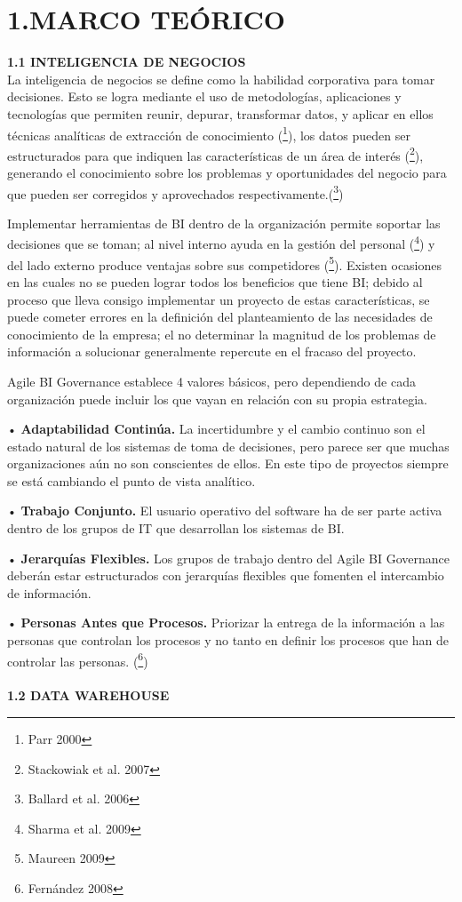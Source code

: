 \documentclass[a4paper,12pt,twocolumn]{article}
\begin{document}
\section*{1.MARCO TEÓRICO} 

\textbf {1.1 INTELIGENCIA DE NEGOCIOS}\\
La inteligencia de negocios se define como la habilidad corporativa para tomar decisiones. Esto se logra mediante el uso de metodologías, aplicaciones y tecnologías que permiten reunir, depurar, transformar datos, y aplicar en ellos técnicas analíticas de extracción de conocimiento (\footnote{Parr 2000}), los datos pueden ser estructurados para que indiquen las características de un área de interés (\footnote{Stackowiak et al. 2007}), generando el conocimiento sobre los problemas y oportunidades del negocio para que pueden ser corregidos y aprovechados respectivamente.(\footnote{Ballard et al. 2006})

Implementar herramientas de BI dentro de la organización permite soportar las decisiones que se toman; al nivel interno ayuda en la gestión del personal (\footnote{Sharma et al. 2009}) y del lado externo produce ventajas sobre sus competidores (\footnote{Maureen 2009}). Existen ocasiones en las cuales no se pueden lograr todos los beneficios que tiene BI; debido al proceso que lleva consigo implementar un proyecto de estas características, se puede cometer errores en la definición del planteamiento de las necesidades de conocimiento de la empresa; el no determinar la magnitud de los problemas de información a solucionar generalmente repercute en el fracaso del proyecto.


Agile BI Governance establece 4 valores básicos, pero dependiendo de cada organización puede incluir los que vayan en relación con su propia estrategia. 
\item • \textbf{Adaptabilidad Continúa.} La incertidumbre y el cambio continuo son el estado natural de los sistemas de toma de decisiones, pero parece ser que muchas organizaciones aún no son conscientes de ellos. En este tipo de proyectos siempre se está cambiando el punto de vista analítico. 
\item • \textbf{Trabajo Conjunto.}  El usuario operativo del software ha de ser parte activa dentro de los grupos de IT que desarrollan los sistemas de BI.
\item • \textbf{Jerarquías Flexibles.} Los grupos de trabajo dentro del Agile BI Governance deberán estar estructurados con jerarquías flexibles que fomenten el intercambio de información.
\item • \textbf{Personas Antes que Procesos.}  Priorizar la entrega de la información a las personas que controlan los procesos y no tanto en definir los procesos que han de controlar las personas. (\footnote{Fernández 2008})
\textbf{}\\
\textbf{}\\
\textbf {1.2 DATA WAREHOUSE}\\
\end{document}
